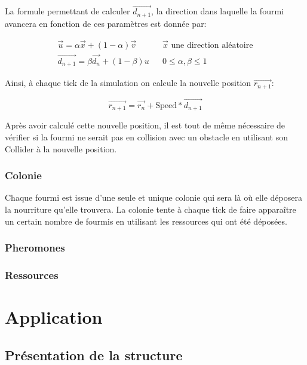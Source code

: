 \documentclass{EPUProjetDi}
\begin{document}
La formule permettant de calculer $\vec{d_{n+1}}$, la direction dans laquelle la fourmi avancera en fonction de ces paramètres est donnée par:

\begin{subequations}
    \begin{align}
        \vec{u}=\alpha \vec{x} + (1 - \alpha) \vec{v} && \text{$\vec{x}$ une direction aléatoire} \\
        \tag{1.4}\vec{d_{n+1}}=\beta \vec{d_{n}} + (1-\beta)u &&  0\leqslant \alpha,\beta \leqslant 1
    \end{align}
\end{subequations}

Ainsi, à chaque tick de la simulation on calcule la nouvelle position $\vec{r_{n+1}}$:

\begin{equation}
    \vec{r_{n+1}} = \vec{r_{n}} + \text{Speed} * \vec{d_{n+1}}
\end{equation}

Après avoir calculé cette nouvelle position, il est tout de même nécessaire de vérifier si la fourmi ne serait pas en collision avec un obstacle en
utilisant son Collider à la nouvelle position. 

\subsubsection{Colonie}

Chaque fourmi est issue d'une seule et unique colonie qui sera là où elle déposera la nourriture qu'elle trouvera. La colonie tente à chaque tick de
faire apparaître un certain nombre de fourmis en utilisant les ressources qui ont été déposées.

\subsubsection{Pheromones}

\subsubsection{Ressources}


\section{Application}

\subsection{Présentation de la structure}
\end{document}
